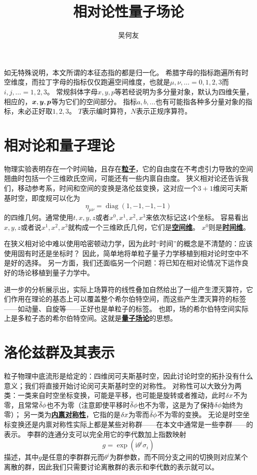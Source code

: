 \documentclass[hyperref, UTF8, a4paper]{ctexart}
\title{相对论性量子场论}
\author{吴何友}
\DeclareMathOperator{\diag}{diag}
\newcommand*{\ii}{\mathrm{i}}
\newcommand{\concept}[1]{\underline{\textbf{#1}}}
\begin{document}
\maketitle

\vspace{2em}

如无特殊说明，本文所谓的本征态指的都是归一化。
希腊字母的指标跑遍所有时空维度，而拉丁字母的指标仅仅跑遍空间维度，也就是$\mu, \nu, \ldots = 0, 1, 2, 3$而$i, j, \ldots = 1, 2, 3$。
常规斜体字母$x, y, p$等若经说明为多分量对象，默认为四维矢量，相应的，$\vb*{x}, \vb*{y}, \vb*{p}$等为它们的空间部分。
指标$a,b,\ldots$也有可能指各种多分量对象的指标，未必正好取$1, 2, 3$。
$T$表示编时算符，$N$表示正规序算符。

\section{相对论和量子理论}

物理实验表明存在一个时间轴，且存在\concept{粒子}，它的自由度在不考虑引力导致的空间翘曲时包括一个三维欧氏空间，可能还有一些内禀自由度。
狭义相对论还告诉我们，移动参考系，时间和空间的变换是洛伦兹变换，这对应一个$3+1$维闵可夫斯基时空，即度规可以化为
\begin{equation}
    \eta_{\mu\nu} = \diag (1, -1, -1, -1)
\end{equation}
的四维几何。通常使用$t, x, y, z$或者$x^0, x^1, x^2, x^3$来依次标记这4个坐标。
容易看出$x, y, z$或者说$x^1, x^2, x^3$就构成一个三维欧氏几何，它们是\concept{空间维}。
$x^0$则是\concept{时间维}。

在狭义相对论中难以使用哈密顿动力学，因为此时“时间”的概念是不清楚的：应该使用固有时还是坐标时？
因此，简单地将单粒子量子力学移植到相对论时空中不是好的选择。
另一方面，我们还面临另一个问题：将已知在相对论情况下运作良好的场论移植到量子力学中。

进一步的分析展示出，实际上场算符的线性叠加自然给出了一组产生湮灭算符，它们作用在理论的基态上可以覆盖整个希尔伯特空间，而这些产生湮灭算符的标签——如动量、自旋等——正好也是单粒子的标签。
也即，场的希尔伯特空间实际上是多粒子态的希尔伯特空间。这就是\concept{量子场论}的思想。

\section{洛伦兹群及其表示}\label{sec:symmetry}

粒子物理中底流形是给定的：四维闵可夫斯基时空，因此讨论时空的拓扑没有什么意义；我们将直接开始讨论闵可夫斯基时空的对称性。
对称性可以大致分为两类：一类来自时空坐标变换，可能是平移，也可能是旋转或者推动，此时$\var{x}$不为零，且常常$\bar{\var}{\phi}$也不为零（注意即使平移时$\bar{\var}{\phi}$也不为零，这是为了保持$\var{\phi}$始终为零）；
另一类为\concept{内禀对称性}，它指的是$\var{x}$为零而$\bar{\var}{\phi}$不为零的变换。
无论是时空坐标变换还是内禀对称性实际上都是某些对称群——在本文中通常是一些李群——的表示。
李群的连通分支可以完全用它的李代数加上指数映射
\[
    g = \exp(\ii \theta^i \sigma_i)
\]
描述，其中$g$是任意的李群群元而$\theta^i$为群参数，而不同分支之间的切换则对应某个离散的群，因此我们只需要讨论离散群的表示和李代数的表示就可以。
\end{document}

